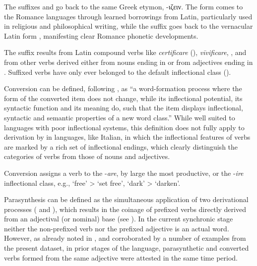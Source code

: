 \documentclass[output=paper,colorlinks,citecolor=brown]{langscibook}
\begin{document}
The suffixes  and  go back to the same Greek etymon, -ιζειν. The form  comes to the Romance languages through learned borrowings from Latin, particularly used in religious and philosophical writing, while the suffix  goes back to the vernacular Latin form , manifesting clear Romance phonetic developments.

The suffix  results from Latin compound verbs like \textit{certificare}  (),  \textit{vīvificare}, ,  and from other verbs derived either from nouns ending in  or from adjectives ending in . Suffixed verbs have only ever belonged to the default inflectional class ().

Conversion  can be defined, following \citet[322]{Valera2015}, as “a word-formation process where the form of the converted item does not change, while its inflectional potential, its syntactic function and its meaning do, such that the item displays inflectional, syntactic and semantic properties of a new word class.” While well suited to languages with poor inflectional systems, this definition does not fully apply to derivation by  in languages, like Italian, in which the inflectional features of verbs are marked by a rich set of inflectional endings, which clearly distinguish the categories of verbs from those of nouns and adjectives.

Conversion  assigns a verb to the -\textit{are}, by large the most productive, or the \nobreakdash-\textit{ire} inflectional class, e.g.,  ‘free’ >  ‘set free’,  ‘dark’ >  ‘darken’.

Parasynthesis can be defined as the simultaneous application of two derivational processes ( and ), which results in the coinage of prefixed verbs directly derived from an adjectival (or nominal) base (see \citealt{Iacobini2021}). In the current synchronic stage neither the non-prefixed verb nor the prefixed adjective is an actual word. However, as already noted in \citet{Iacobini2004}, and corroborated by a number of examples from the present dataset, in prior stages of the language, parasynthetic and converted verbs  formed from the same adjective were attested in the same time period.
\end{document}
